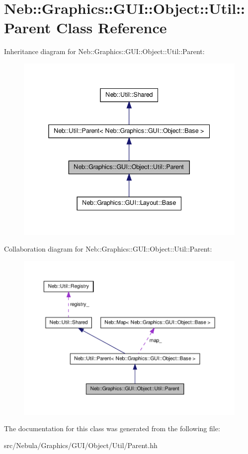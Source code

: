 \hypertarget{classNeb_1_1Graphics_1_1GUI_1_1Object_1_1Util_1_1Parent}{\section{\-Neb\-:\-:\-Graphics\-:\-:\-G\-U\-I\-:\-:\-Object\-:\-:\-Util\-:\-:\-Parent \-Class \-Reference}
\label{classNeb_1_1Graphics_1_1GUI_1_1Object_1_1Util_1_1Parent}
}


\-Inheritance diagram for \-Neb\-:\-:\-Graphics\-:\-:\-G\-U\-I\-:\-:\-Object\-:\-:\-Util\-:\-:\-Parent\-:\nopagebreak
\begin{figure}[H]
\begin{center}
\leavevmode
\includegraphics[width=338pt]{classNeb_1_1Graphics_1_1GUI_1_1Object_1_1Util_1_1Parent__inherit__graph}
\end{center}
\end{figure}


\-Collaboration diagram for \-Neb\-:\-:\-Graphics\-:\-:\-G\-U\-I\-:\-:\-Object\-:\-:\-Util\-:\-:\-Parent\-:\nopagebreak
\begin{figure}[H]
\begin{center}
\leavevmode
\includegraphics[width=350pt]{classNeb_1_1Graphics_1_1GUI_1_1Object_1_1Util_1_1Parent__coll__graph}
\end{center}
\end{figure}


\-The documentation for this class was generated from the following file\-:\begin{DoxyCompactItemize}
\item 
src/\-Nebula/\-Graphics/\-G\-U\-I/\-Object/\-Util/\-Parent.\-hh\end{DoxyCompactItemize}
